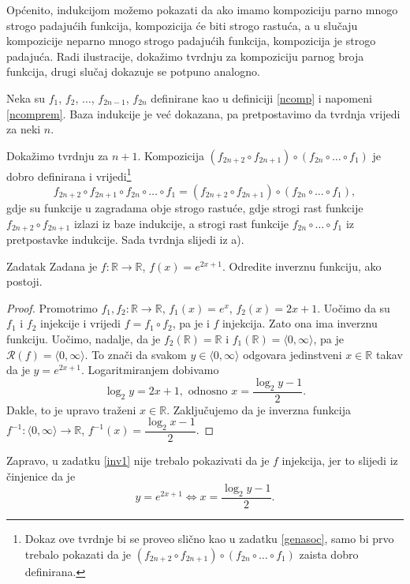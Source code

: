 \begin{remark}
Općenito, indukcijom možemo pokazati da ako imamo kompoziciju parno mnogo strogo padajućih funkcija, kompozicija će biti strogo rastuća, a u slučaju kompozicije neparno mnogo strogo padajućih funkcija, kompozicija je strogo padajuća. Radi ilustracije, dokažimo tvrdnju za kompoziciju parnog broja funkcija, drugi slučaj dokazuje se potpuno analogno. 

Neka su \(f_1\), \(f_2\), \(\dots\), \(f_{2n-1}\), \(f_{2n}\) definirane kao u definiciji \ref{ncomp} i napomeni \ref{ncomprem}. Baza indukcije je već dokazana, pa pretpostavimo da tvrdnja vrijedi za neki \(n\). 

Dokažimo tvrdnju za \(n+1\). Kompozicija \((f_{2n+2}\circ f_{2n+1})\circ(f_{2n}\circ \dots \circ f_1)\) je dobro definirana i vrijedi\footnote{Dokaz ove tvrdnje bi se proveo slično kao u zadatku \ref{genasoc}, samo bi prvo trebalo pokazati da je \((f_{2n+2}\circ f_{2n+1})\circ(f_{2n}\circ \dots \circ f_1)\) zaista dobro definirana.}
\[f_{2n+2}\circ f_{2n+1}\circ f_{2n}\circ \dots \circ f_{1}=(f_{2n+2}\circ f_{2n+1})\circ (f_{2n}\circ \dots \circ f_{1}),\] gdje su funkcije u zagradama obje strogo rastuće, gdje strogi rast funkcije \(f_{2n+2}\circ f_{2n+1}\) izlazi iz baze indukcije, a strogi rast funkcije \(f_{2n}\circ \dots \circ f_{1}\) iz pretpostavke indukcije. Sada tvrdnja slijedi iz a).
\end{remark}
\begin{exercise}{Zadatak}
\label{inv1}
Zadana je \(f : \mathbb{R}\to \mathbb{R}\), \(f(x)=e^{2x+1}\). Odredite inverznu funkciju, ako postoji.
\end{exercise}
\begin{proof}
Promotrimo \(f_1, f_2 : \mathbb{R}\to \mathbb{R}\), \(f_1(x)=e^x\), \(f_2(x)=2x+1\). Uočimo da su \(f_1\) i \(f_2\) injekcije i vrijedi \(f=f_1\circ f_2\), pa je i \(f\) injekcija. Zato ona ima inverznu funkciju. Uočimo, nadalje, da je \(f_2(\mathbb{R})=\mathbb{R}\) i \(f_1(\mathbb{R})=\langle 0, \infty\rangle\), pa je \(\mathcal{R}(f)=\langle 0, \infty\rangle\). To znači da svakom \(y\in \langle 0, \infty\rangle\) odgovara jedinstveni \(x\in \mathbb{R}\) takav da je \(y=e^{2x+1}\). Logaritmiranjem dobivamo
\[\log_2{y}=2x+1,\text{ odnosno } x=\dfrac{\log_2{y}-1}{2}.\]
Dakle, to je upravo traženi \(x\in \mathbb{R}\). Zaključujemo da je inverzna funkcija \(f^{-1} : \langle 0, \infty\rangle \to \mathbb{R}\), \(f^{-1}(x)=\dfrac{\log_2{x}-1}{2}\).
\end{proof}
\begin{remark}
Zapravo, u zadatku \ref{inv1} nije trebalo pokazivati da je \(f\) injekcija, jer to slijedi iz činjenice da je
\[y=e^{2x+1}\Leftrightarrow x=\dfrac{\log_2{y}-1}{2}.\]
\end{remark}
